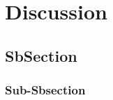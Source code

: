 \newpage
\section{Discussion}
\label{sec:Section07}

\subsection{SbSection}
\label{sec:Section0x.a-}

\subsubsection{Sub-Sbsection}
